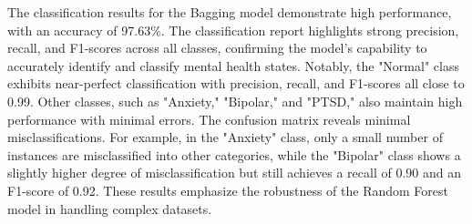 \noindent
The classification results for the Bagging model demonstrate high performance, with an accuracy of 97.63\%. The classification report highlights strong precision, recall, and F1-scores across all classes, confirming the model's capability to accurately identify and classify mental health states. Notably, the "Normal" class exhibits near-perfect classification with precision, recall, and F1-scores all close to 0.99. Other classes, such as "Anxiety," "Bipolar," and "PTSD," also maintain high performance with minimal errors. The confusion matrix reveals minimal misclassifications. For example, in the "Anxiety" class, only a small number of instances are misclassified into other categories, while the "Bipolar" class shows a slightly higher degree of misclassification but still achieves a recall of 0.90 and an F1-score of 0.92. These results emphasize the robustness of the Random Forest model in handling complex datasets.

